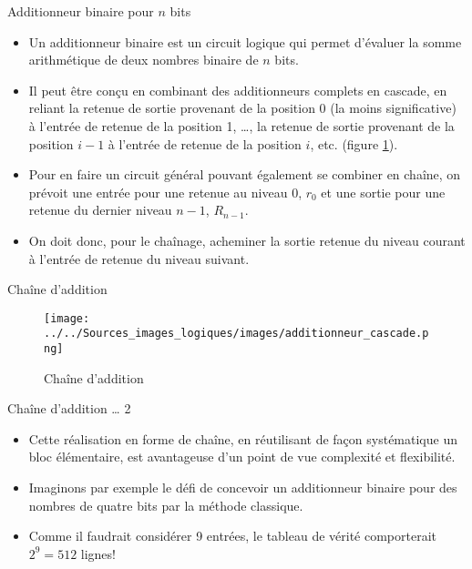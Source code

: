 \documentclass[presentation]{beamer}
\begin{document}
\begin{frame}[label={sec:orgd3c172c}]{Additionneur binaire pour \(n\) bits}
\begin{itemize}
\item Un additionneur binaire est un circuit logique qui permet d'évaluer la somme arithmétique de deux nombres binaire de \(n\) bits.

\item Il peut être conçu en combinant des additionneurs complets en cascade, en reliant la retenue de sortie provenant de la position 0 (la moins significative) à l'entrée de retenue de la position 1, \ldots{}, la retenue de sortie provenant de la position \(i-1\) à l'entrée de retenue de la position \(i\), etc. (figure \ref{fig:org14822a5}).

\item Pour en faire un circuit général pouvant également se combiner en chaîne, on prévoit une entrée pour une retenue au niveau 0, \(r_0\) et une sortie pour une retenue du dernier niveau \(n-1\), \(R_{n-1}\).

\item On doit donc, pour le chaînage, acheminer la sortie retenue du niveau courant à l'entrée de retenue du niveau suivant.
\end{itemize}
\end{frame}

\begin{frame}[label={sec:orgbd5c0ad}]{Chaîne d'addition}
\begin{figure}[htbp]
\centering
\texttt{[image: ../../Sources\_images\_logiques/images/additionneur\_cascade.png]}
\caption{\label{fig:org14822a5}Chaîne d'addition}
\end{figure}
\end{frame}

\begin{frame}[label={sec:orgc56a162}]{Chaîne d'addition \ldots{} 2}
\begin{itemize}
\item Cette réalisation en forme de chaîne, en réutilisant de façon systématique un bloc élémentaire, est avantageuse d'un point de vue complexité et flexibilité.

\item Imaginons par exemple le défi de concevoir un additionneur binaire pour des nombres de quatre bits par la méthode classique.

\item Comme il faudrait considérer 9 entrées, le tableau de vérité comporterait \(2^9= 512\) lignes!
\end{itemize}
\end{frame}
\end{document}
